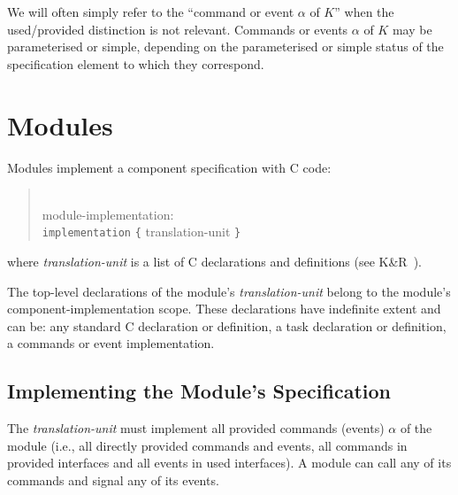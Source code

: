 \documentclass[11pt,letterpaper]{article}
\newcommand{\kw}[1]{{\tt #1}}
\newcommand{\grammarshift}{\vspace*{-.7cm}}
\newcommand{\grammarindent}{\hspace*{2cm}\= \\ \kill}
\begin{document}
We will often simply refer to the ``command or event $\alpha$ of $K$'' when
the used/provided distinction is not relevant.  Commands or events $\alpha$
of $K$ may be parameterised or simple, depending on the parameterised or
simple status of the specification element to which they correspond.

\section{Modules}
\label{sec:module}

Modules implement a component specification with C code:
\begin{quote} \grammarshift \em \begin{tabbing}
\grammarindent
module-implementation:\\
\>	\kw{implementation} \kw{\{} translation-unit \kw{\}}\\
\end{tabbing} \end{quote}
where \emph{translation-unit} is a list of C declarations and definitions
(see K\&R~\cite[pp234--239]{kandr}). 

The top-level declarations of the module's \emph{translation-unit} belong
to the module's component-implementation scope. These declarations have
indefinite extent and can be: any standard C declaration or definition, a
task declaration or definition, a commands or event
implementation.

\subsection{Implementing the Module's Specification}

The \emph{translation-unit} must implement all provided commands
(events) $\alpha$ of the module (i.e., all directly provided commands and
events, all commands in provided interfaces and all events in used
interfaces). A module can call any of its commands and signal any of its
events.
\end{document}
